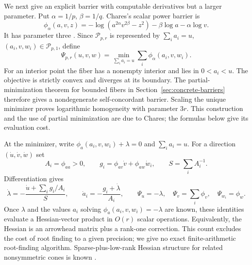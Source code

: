 We next give an explicit barrier with computable derivatives but a
larger parameter. Put
$\alpha=1/p$, $\beta=1/q$. Chares's scalar power barrier is
\begin{equation}\label{eq:chares-scalar-power}
 \phi_\alpha(a,v,z)
 =-\log(a^{2\alpha}v^{2\beta}-z^2)-\beta\log a-\alpha\log v.
\end{equation}
It has parameter three \citep[Theorem~3.1.1]{Chares2009}. Since
$\mathcal P_{p,r}$ is represented by
$\sum_i a_i=u$, $(a_i,v,w_i)\in\mathcal P_{p,1}$, define
\begin{equation}\label{eq:grouped-implicit-barrier}
 \Psi_{p,r}(u,v,w)=
 \min_{\sum_i a_i=u}\sum_i\phi_\alpha(a_i,v,w_i).
\end{equation}
For an interior point the fiber has a nonempty interior and lies in
$0<a_i<u$. The objective is strictly convex and diverges at its
boundary. The partial-minimization theorem for bounded fibers in
Section~\ref{sec:concrete-barriers} therefore gives a nondegenerate
self-concordant barrier. Scaling the unique minimizer proves logarithmic
homogeneity with parameter $3r$. This construction and the use of partial
minimization are due to Chares; the formulas below give its
evaluation cost.

At the minimizer, write $\phi_a(a_i,v,w_i)+\lambda=0$ and
$\sum_i a_i=u$. For a direction $(\dot u,\dot v,\dot w)$ set
\[
 A_i=\phi_{aa}>0,\qquad
 g_i=\phi_{av}\dot v+\phi_{aw}\dot w_i,\qquad S=\sum_i A_i^{-1}.
\]
Differentiation gives
\begin{equation}\label{eq:grouped-hessian-oracle}
 \dot\lambda=-\frac{\dot u+\sum_i g_i/A_i}{S},\qquad
 \dot a_i=-\frac{g_i+\dot\lambda}{A_i},\qquad
 \Psi_u=-\lambda,\quad\Psi_v=\sum_i\phi_v,\quad
 \Psi_{w_i}=\phi_w.
\end{equation}
Once $\lambda$ and the values $a_i$ solving
$\phi_a(a_i,v,w_i)=-\lambda$ are known, these identities evaluate a
Hessian-vector product in $O(r)$ scalar operations. Equivalently, the
Hessian is an arrowhead matrix plus a rank-one correction. This count
excludes the cost of root finding to a given precision; we give no
exact finite-arithmetic root-finding algorithm. Sparse-plus-low-rank
Hessian structure for related nonsymmetric cones is known
\citep{ChenGoulart2025}.

